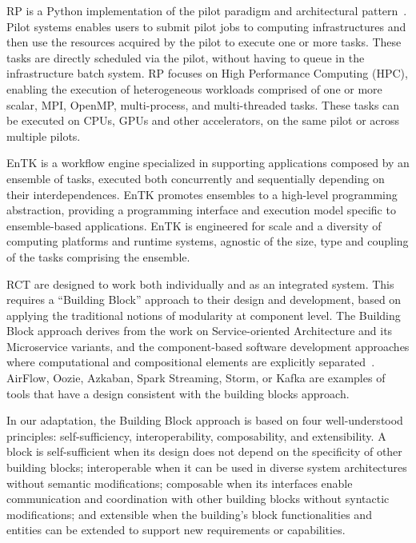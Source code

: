 \documentclass[preprint,12pt, a4paper]{elsarticle}
\begin{document}
RP is a Python implementation of the pilot paradigm and architectural
pattern~\cite{turilli2018comprehensive}. Pilot systems enables users to
submit pilot jobs to computing infrastructures and then use the resources
acquired by the pilot to execute one or more tasks. These tasks are directly
scheduled via the pilot, without having to queue in the infrastructure batch
system. RP focuses on High Performance Computing (HPC), enabling the
execution of heterogeneous workloads comprised of one or more scalar, MPI,
OpenMP, multi-process, and multi-threaded tasks. These tasks can be executed
on CPUs, GPUs and other accelerators, on the same pilot or across multiple
pilots.

EnTK is a workflow engine specialized in supporting applications composed by
an ensemble of tasks, executed both concurrently and sequentially depending
on their interdependences. EnTK promotes ensembles to a high-level
programming abstraction, providing a programming interface and execution
model specific to ensemble-based applications. EnTK is engineered for scale
and a diversity of computing platforms and runtime systems, agnostic of the
size, type and coupling of the tasks comprising the ensemble.


RCT are designed to work both individually and as an integrated system. This
requires a ``Building Block'' approach to their design and development, based
on applying the traditional notions of modularity at component level. The
Building Block approach derives from the work on Service-oriented
Architecture and its Microservice variants, and the component-based software
development approaches where computational and compositional elements are
explicitly
separated~\cite{batory1992design,garlan1995architectural,lenz1988software,clemens1998component,schneider2000components}.
AirFlow, Oozie, Azkaban, Spark Streaming, Storm, or Kafka are examples of
tools that have a design consistent with the building blocks approach.

In our adaptation, the Building Block approach is based on four
well-understood principles: self-sufficiency, interoperability,
composability, and extensibility. A block is self-sufficient when its design
does not depend on the specificity of other building blocks; interoperable
when it can be used in diverse system architectures without semantic
modifications; composable when its interfaces enable communication and
coordination with other building blocks without syntactic modifications; and
extensible when the building's block functionalities and entities can be
extended to support new requirements or capabilities. 
\end{document}
